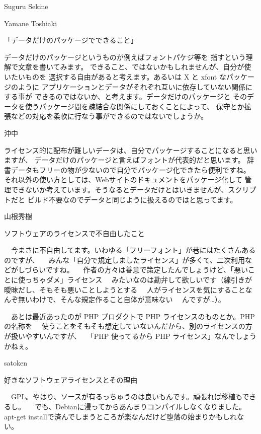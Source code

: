 \documentclass[cjk,dvipdfmx,12pt]{beamer}
\begin{document}
\begin{frame}{Suguru Sekine}
\end{frame}\begin{frame}{Yamane Toshiaki}

「データだけのパッケージでできること」

データだけのパッケージというものが例えばフォントパケジ等を
指すという理解で文章を書いてみます。
できること、ではないかもしれませんが、自分が使いたいものを
選択する自由があると考えます。あるいは X と xfont なパッケージのように
アプリケーションとデータがそれぞれ互いに依存していない関係にする事が
できるのではないか、と考えます。データだけのパッケージと
そのデータを使うパッケージ間を疎結合な関係にしておくことによって、
保守とか拡張などの対応を柔軟に行なう事ができるのではないでしょうか。

\end{frame}\begin{frame}{沖中}

ライセンス的に配布が難しいデータは、自分でパッケージすることになると思いますが、
データだけのパッケージと言えばフォントが代表的だと思います。
辞書データもフリーの物が少ないので自分でパッケージ化できたら便利ですね。
それ以外の使い方としては、Webサイトのドキュメントをパッケージ化して
管理できないか考えています。そうなるとデータだけとはいきませんが、スクリプトだと
ビルド不要なのでデータと同じように扱えるのではと思ってます。


\end{frame}\begin{frame}{山根秀樹}

ソフトウェアのライセンスで不自由したこと

　今まさに不自由してます。いわゆる「フリーフォント」が巷にはたくさんあるのですが、
　みんな「自分で規定しましたライセンス」が多くて、二次利用などがしづらいですね。
　作者の方々は善意で策定したんでしょうけど、「悪いことに使っちゃダメ」ライセンス
　みたいなのは勘弁して欲しいです（線引きが曖昧だし、そもそも悪いことしようとする
　人がライセンスを気にすることなんぞ無いわけで、そんな規定作ること自体が意味ない
　んですが…）。

　あとは最近あったのが PHP プロダクトで PHP ライセンスのものとか。PHP の名称を
　使うことをそもそも想定していないんだから、別のライセンスの方が扱いやすいんですが、
　「PHP 使ってるから PHP ライセンス」なんでしょうかねぇ。


\end{frame}\begin{frame}{satoken}

好きなソフトウェアライセンスとその理由

　GPL。やはり、ソースが有るっちゅうのは良いもんです。頑張れば移植もできるし。
　でも、Debianに浸ってからあんまりコンパイルしなくなりました。apt-get installで済んでしまうところが楽なんだけど堕落の始まりかもしれない。


\end{frame}
\end{document}
